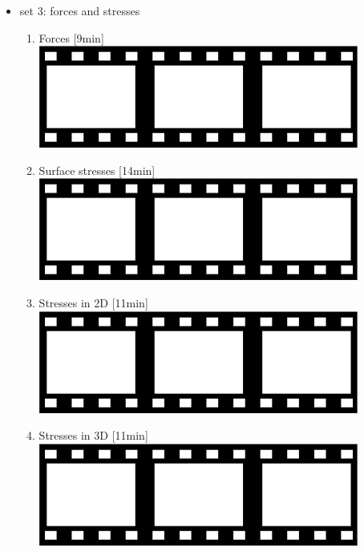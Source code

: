 \begin{itemize}
\item set 3: forces and stresses
\begin{enumerate}
\item Forces [9min] \href{https://youtu.be/ILFqNowqknw?si=zjLwx-es2OwZQkcU}{\includegraphics[width=.8cm]{images/pictograms/film.png}}
\item Surface stresses [14min] \href{https://youtu.be/_if5w_wk7-w?si=RnMAEX21xeoPsjoi}{\includegraphics[width=.8cm]{images/pictograms/film.png}}
\item Stresses in 2D [11min] \href{https://youtu.be/gBYu8IuJfTw?si=r6w2utvZs2sJpEKX}{\includegraphics[width=.8cm]{images/pictograms/film.png}}
\item Stresses in 3D [11min] \href{https://youtu.be/wou1yP8PxNM?si=cXhgqQGEX3qcXZrT}{\includegraphics[width=.8cm]{images/pictograms/film.png}}
\end{enumerate}


\end{itemize}
